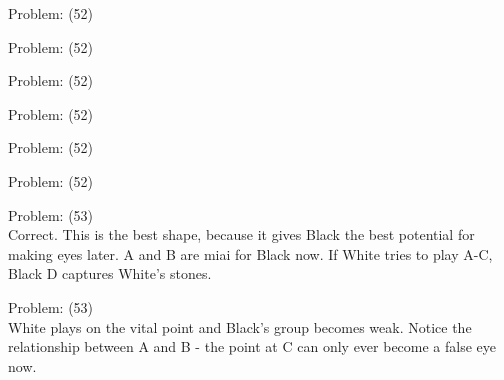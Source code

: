 \documentclass[11pt]{article}
\begin{document}
\begin{minipage}[t]{0.5\textwidth}
  {\centering
  
Problem: (52)\\
  }
\end{minipage}
\begin{minipage}[t]{0.5\textwidth}
  {\centering
  
Problem: (52)\\
  }
\end{minipage}
\begin{minipage}[t]{0.5\textwidth}
  {\centering
  
Problem: (52)\\
  }
\end{minipage}
\begin{minipage}[t]{0.5\textwidth}
  {\centering
  
Problem: (52)\\
  }
\end{minipage}
\begin{minipage}[t]{0.5\textwidth}
  {\centering
  
Problem: (52)\\
  }
\end{minipage}
\begin{minipage}[t]{0.5\textwidth}
  {\centering
  
Problem: (52)\\
  }
\end{minipage}
\begin{minipage}[t]{0.5\textwidth}
  {\centering
  
Problem: (53)\\
Correct. This is the best shape, because it gives Black the best potential for making eyes later. A and B are miai for Black now. If White tries to play A-C, Black D captures White's stones.\\
  }
\end{minipage}
\begin{minipage}[t]{0.5\textwidth}
  {\centering
  
Problem: (53)\\
White plays on the vital point and Black's group becomes weak. Notice the relationship between A and B - the point at C can only ever become a false eye now.\\
  }
\end{minipage}
\end{document}
